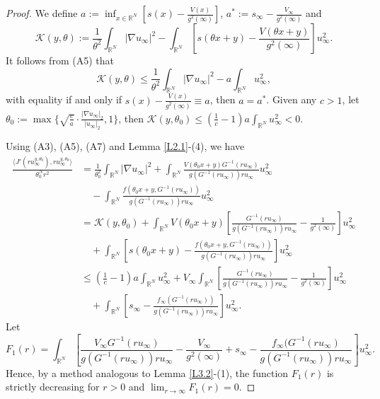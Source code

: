 \documentclass[reqno]{amsart}
\begin{document}
\begin{proof}
We define $a:=\inf_{x\in{\mathbb{R}^N}}[s(x)-\frac{V(x)}{g^2(\infty)}]$, 
$a^*:=s_\infty-\frac{V_\infty}{g^2(\infty)}$ and 
$$
\mathcal{K}(y,\theta):=\frac{1}{\theta^2}\int_{\mathbb{R}^N}|\nabla u_\infty|^2-\int_{\mathbb{R}^N}[s(\theta x+y)-\frac{V(\theta x+y)}{g^2(\infty)}]u_\infty^2.
$$
It follows from (A5) that
$$
\mathcal{K}(y,\theta)\leq\frac{1}{\theta^2}\int_{\mathbb{R}^N}|\nabla u_\infty|^2-a\int_{\mathbb{R}^N}u_\infty^2,
$$
with equality if and only if $s(x)-\frac{V(x)}{g^2(\infty)}\equiv a$, then $a=a^*$. 
Given any  $c > 1$, let 
$\theta_0:=\max\{\sqrt{\frac{c}{a}}\cdot\frac{|\nabla u_\infty|_2}{|u_\infty|_2},1\}$, then 
$\mathcal{K}(y,\theta_0)\leq(\frac{1}{c}-1)a\int_{\mathbb{R}^N}u_\infty^2<0$.

Using (A3), (A5), (A7) and Lemma \ref{L2.1}-(4), we have 
\begin{align*}
\frac{\langle J'(ru_{\infty}^{y,\theta_0}),ru_{\infty}^{y,\theta_0}\rangle}{\theta^N_0r^{2}} 
&=\frac{1}{\theta^2_0}\int_{\mathbb{R}^{N}} \vert \nabla u_{\infty} \vert^{2} + \int_{\mathbb{R}^{N}} \frac{V(\theta_0 x+y) G^{-1}(ru_{\infty})}{g(G^{-1}(ru_{\infty}))ru_{\infty}} u_{\infty}^{2} \\
 &\quad  - \int_{\mathbb{R}^{N}}  \frac{f(\theta_0 x+y,G^{-1}(ru_{\infty}))}{g(G^{-1}(ru_{\infty}))ru_{\infty}} u_{\infty}^{2} \\
&=\mathcal{K}(y,\theta_0)+\int_{\mathbb{R}^{N}} V(\theta_0 x+y)[\frac{ G^{-1}(ru_{\infty})}{g(G^{-1}(ru_{\infty}))ru_{\infty}}-\frac{1}{g^2(\infty)}]u_{\infty}^{2}\\
&\quad  +\int_{\mathbb{R}^{N}} [s(\theta_0 x+y)- \frac{f (\theta_0 x+y,G^{-1}(ru_{\infty}))}{g(G^{-1}(ru_{\infty}))ru_{\infty}}]u_{\infty}^{2}\\
&\leq(\frac{1}{c}-1)a\int_{\mathbb{R}^N}u_\infty^2+V_\infty\int_{\mathbb{R}^{N}} [\frac{ G^{-1}(ru_{\infty})}{g(G^{-1}(ru_{\infty}))ru_{\infty}}-\frac{1}{g^2(\infty)}]u_{\infty}^{2} \\
&\quad  +\int_{\mathbb{R}^{N}} [s_\infty- \frac{f_\infty(G^{-1}(ru_{\infty}))}{g(G^{-1}(ru_{\infty}))ru_{\infty}}]u_{\infty}^{2}.
\end{align*}
Let 
$$
F_1(r)=\int_{\mathbb{R}^{N}} [\frac{ V_\infty G^{-1}(ru_{\infty})}{g(G^{-1}(ru_{\infty}))ru_{\infty}}-\frac{V_\infty}{g^2(\infty)}+s_\infty- \frac{f_\infty(G^{-1}(ru_{\infty})}{g(G^{-1}(ru_{\infty}))ru_{\infty}}]u_{\infty}^{2}.
$$ 
Hence, by a method analogous to Lemma \ref{L3.2}-(1), the function \(F_1(r)\) is strictly 
decreasing for \(r > 0\) and $\lim_{r\to\infty}F_1(r)=0$. 

\end{proof}
\end{document}
